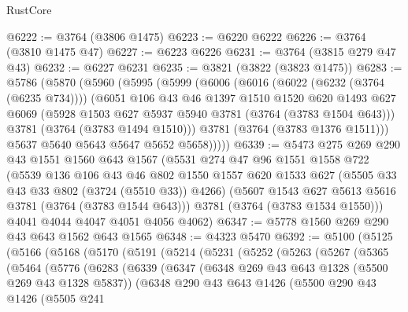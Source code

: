 \begin{lexlean}{RustCore}
\begin{coremodule}
@6222 := @3764 (@3806 @1475)
@6223 := @6220 @6222
@6226 := @3764 (@3810 @1475 @47)
@6227 := @6223 @6226
@6231 := @3764 (@3815 @279 @47 @43)
@6232 := @6227 @6231
@6235 := @3821 (@3822 (@3823 @1475))
@6283 := @5786
    (@5870
      (@5960
        (@5995
          (@5999
            (@6006
              (@6016
                (@6022 (@6232 (@3764 (@6235 @734))))
                (@6051
                  @106
                  @43
                  @46
                  @1397
                  @1510
                  @1520
                  @620
                  @1493
                  @627
                  @6069
                  (@5928 @1503 @627 @5937 @5940 @3781 (@3764 (@3783 @1504 @643)))
                  @3781
                  (@3764 (@3783 @1494 @1510)))
                @3781
                (@3764 (@3783 @1376 @1511)))
              @5637
              @5640
              @5643
              @5647
              @5652
              @5658)))))
@6339 := @5473
    @275
    @269
    @290
    @43
    @1551
    @1560
    @643
    @1567
    (@5531
      @274
      @47
      @96
      @1551
      @1558
      @722
      (@5539
        @136
        @106
        @43
        @46
        @802
        @1550
        @1557
        @620
        @1533
        @627
        (@5505 @33 @43 @33 @802 (@3724 (@5510 @33)) @4266)
        (@5607 @1543 @627 @5613 @5616 @3781 (@3764 (@3783 @1544 @643)))
        @3781
        (@3764 (@3783 @1534 @1550)))
      @4041
      @4044
      @4047
      @4051
      @4056
      @4062)
@6347 := @5778 @1560 @269 @290 @43 @643 @1562 @643 @1565
@6348 := @4323 @5470
@6392 := @5100
    (@5125
      (@5166
        (@5168
          (@5170
            (@5191
              (@5214
                (@5231
                  (@5252
                    (@5263
                      (@5267
                        (@5365
                          (@5464
                            (@5776
                              (@6283
                                (@6339
                                  (@6347
                                    (@6348 @269 @43 @643 @1328 (@5500 @269 @43 @1328 @5837))
                                    (@6348
                                      @290
                                      @43
                                      @643
                                      @1426
                                      (@5500
                                        @290
                                        @43
                                        @1426
                                        (@5505
                                          @241

\end{coremodule}
\end{lexlean}
